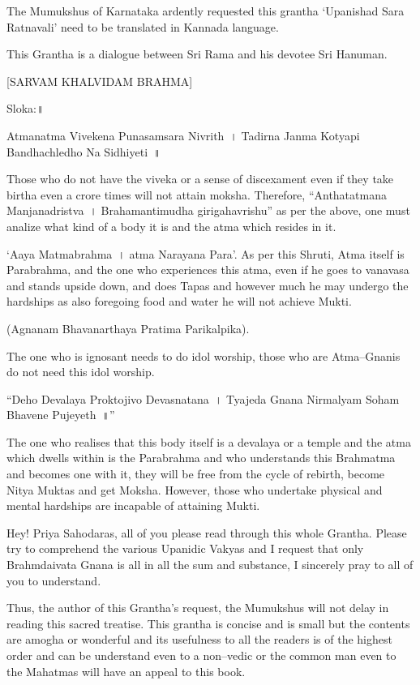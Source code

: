 The Mumukshus of Karnataka ardently requested this grantha ‘Upanishad Sara Ratnavali’ need to be translated in Kannada language.

This Grantha is a dialogue between Sri Rama and his devotee Sri Hanuman.


[SARVAM KHALVIDAM BRAHMA]

Sloka:॥

 Atmanatma Vivekena Punasamsara Nivrith~।
 Tadirna Janma Kotyapi Bandhachledho Na Sidhiyeti~॥

Those who do not have the viveka or a sense of discexament even if they take birtha even a crore times will not attain moksha. Therefore, “Anthatatmana Manjanadristva~। Brahamantimudha girigahavrishu” as per the above, one must analize what kind of a body it is and the atma which resides in it.

‘Aaya Matmabrahma~। atma Narayana Para’. As per this Shruti, Atma itself is Parabrahma, and the one who experiences this atma, even if he goes to vanavasa and stands upside down, and does Tapas and however much he may undergo the hardships as also foregoing food and water he will not achieve Mukti.

(Agnanam Bhavanarthaya Pratima Parikalpika).

The one who is ignosant needs to do idol worship, those who are Atma–Gnanis do not need this idol worship.

 “Deho Devalaya Proktojivo Devasnatana~।
 Tyajeda Gnana Nirmalyam Soham Bhavene Pujeyeth~॥”

The one who realises that this body itself is a devalaya or a temple and the atma which dwells within is the Parabrahma and who understands this Brahmatma and becomes one with it, they will be free from the cycle of rebirth, become Nitya Muktas and get Moksha. However, those who undertake physical and mental hardships are incapable of attaining Mukti.

Hey! Priya Sahodaras, all of you please read through this whole Grantha. Please try to comprehend the various Upanidic Vakyas and I request that only Brahmdaivata Gnana is all in all the sum and substance, I sincerely pray to all of you to understand.

Thus, the author of this Grantha's request, the Mumukshus will not delay in reading this sacred treatise. This grantha is concise and is small but the contents are amogha or wonderful and its usefulness to all the readers is of the highest order and can be understand even to a non–vedic or the common man even to the Mahatmas will have an appeal to this book.

